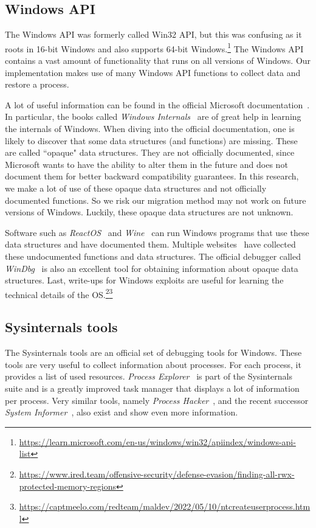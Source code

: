 \documentclass[a4paper, 11pt, english]{report}
\begin{document}
\subsection{Windows API}
The Windows API was formerly called Win32 API, but this was confusing as it roots in 16-bit Windows and also supports 64-bit Windows.\footnote{\url{https://learn.microsoft.com/en-us/windows/win32/apiindex/windows-api-list}} The Windows API contains a vast amount of functionality that runs on all versions of Windows. Our implementation makes use of many Windows API functions to collect data and restore a process.

A lot of useful information can be found in the official Microsoft documentation~\cite{win32-api}. In particular, the books called \textit{Windows Internals}~\cite{windows-internals}\cite{windows-internals-2} are of great help in learning the internals of Windows. When diving into the official documentation, one is likely to discover that some data structures (and functions) are missing. These are called ``opaque" data structures. They are not officially documented, since Microsoft wants to have the ability to alter them in the future and does not document them for better backward compatibility guarantees. In this research, we make a lot of use of these opaque data structures and not officially documented functions. So we risk our migration method may not work on future versions of Windows. Luckily, these opaque data structures are not unknown.

Software such as \textit{ReactOS}~\cite{reactos} and \textit{Wine}~\cite{winehq} can run Windows programs that use these data structures and have documented them. Multiple websites~\cite{undocumented}\cite{process-hacker-docs} have collected these undocumented functions and data structures. The official debugger called \textit{WinDbg}~\cite{windbg} is also an excellent tool for obtaining information about opaque data structures.
Last, write-ups for Windows exploits are useful for learning the technical details of the OS.\footnote{\url{https://www.ired.team/offensive-security/defense-evasion/finding-all-rwx-protected-memory-regions}}\footnote{\url{https://captmeelo.com/redteam/maldev/2022/05/10/ntcreateuserprocess.html}}


\subsection{Sysinternals tools}
The Sysinternals tools are an official set of debugging tools for Windows. These tools are very useful to collect information about processes. For each process, it provides a list of used resources. \textit{Process Explorer}~\cite{process-explorer} is part of the Sysinternals suite and is a greatly improved task manager that displays a lot of information per process. Very similar tools, namely \textit{Process Hacker}~\cite{process-hacker}, and the recent successor \textit{System Informer}~\cite{system-informer}, also exist and show even  more information.
\end{document}
